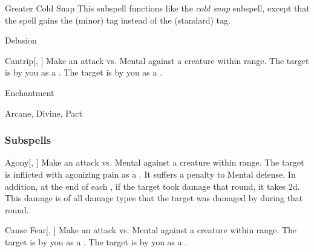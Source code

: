 \begin{ability}[\nth{4}]{Greater Cold Snap}
This subspell functions like the \textit{cold snap} subspell, except that the spell gains the  (minor) tag instead of the  (standard) tag.
\end{ability}
\vspace{0.25em}

\newpage
\begin{spellsection}{Delusion}

\begin{spellheader}
\end{spellheader}


\begin{ability}{Cantrip}[, ]
Make an attack vs. Mental against a creature within \rngmed range.
\hit The target is  by you as a .
\crit The target is  by you as a .
\end{ability}




 Enchantment

 Arcane, Divine, Pact
\end{spellsection}


\subsubsection{Subspells}


\begin{ability}[\nth{1}]{Agony}[, ]
Make an attack vs. Mental against a creature within \rngmed range.
\hit The target is inflicted with agonizing pain as a .
It suffers a  penalty to Mental defense.
In addition, at the end of each , if the target took damage that round, it takes  \minus2d.
This damage is of all damage types that the target was damaged by during that round.
\end{ability}
\vspace{0.25em}


\begin{ability}[\nth{1}]{Cause Fear}[, ]
Make an attack vs. Mental against a creature within \rngmed range.
\hit The target is \frightened by you as a .
\crit The target is \panicked by you as a .
\end{ability}
\vspace{0.25em}


